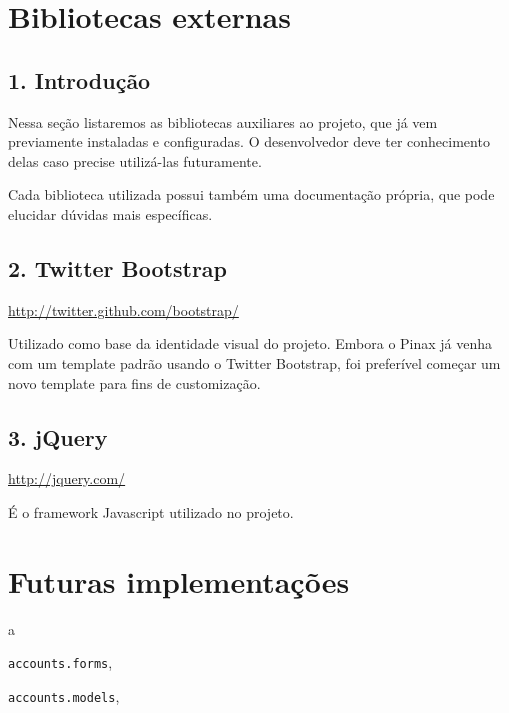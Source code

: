 \documentclass[letterpaper,10pt,brazil]{sphinxmanual}
\begin{document}
\section{Bibliotecas externas}
\label{bibliotecas:bibliotecas-externas}\label{bibliotecas::doc}

\subsection{1. Introdução}
\label{bibliotecas:introducao}
Nessa seção listaremos as bibliotecas auxiliares ao projeto, que já vem previamente instaladas e configuradas. O desenvolvedor deve ter conhecimento delas caso precise utilizá-las futuramente.

Cada biblioteca utilizada possui também uma documentação própria, que pode elucidar dúvidas mais específicas.


\subsection{2. Twitter Bootstrap}
\label{bibliotecas:twitter-bootstrap}
\href{http://twitter.github.com/bootstrap/}{http://twitter.github.com/bootstrap/}

Utilizado como base da identidade visual do projeto. Embora o Pinax já venha com um template padrão usando o Twitter Bootstrap, foi preferível começar um novo template para fins de customização.


\subsection{3. jQuery}
\label{bibliotecas:jquery}
\href{http://jquery.com/}{http://jquery.com/}

É o framework Javascript utilizado no projeto.


\section{Futuras implementações}
\label{futuro::doc}\label{futuro:futuras-implementacoes}

\renewcommand{\indexname}{Índice de Módulos do Python}
\begin{theindex}
\def\bigletter#1{{\Large\sffamily#1}\nopagebreak\vspace{1mm}}
\bigletter{a}
\item {\texttt{accounts.forms}}, \pageref{apps/accounts:module-accounts.forms}
\item {\texttt{accounts.models}}, \pageref{apps/accounts:module-accounts.models}
\end{theindex}

\renewcommand{\indexname}{Índice}
\printindex
\end{document}
